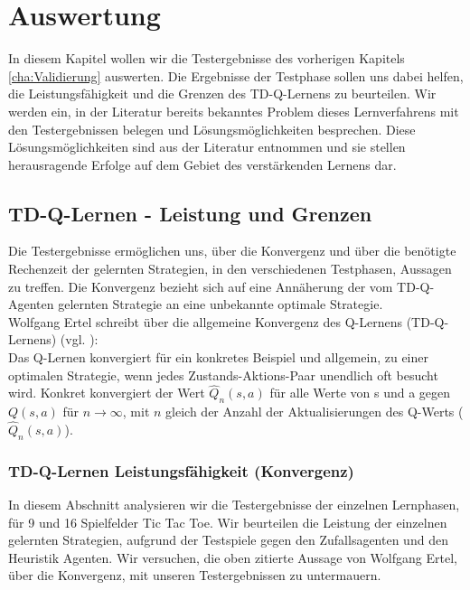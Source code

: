 \chapter{Auswertung}
\label{cha:Auswertung}
In diesem Kapitel wollen wir die Testergebnisse des vorherigen Kapitels \ref{cha:Validierung} auswerten. Die Ergebnisse der Testphase sollen uns dabei helfen, die Leistungsfähigkeit und die Grenzen des TD-Q-Lernens zu beurteilen. Wir werden ein, in der Literatur bereits bekanntes Problem dieses Lernverfahrens mit den Testergebnissen belegen und Lösungsmöglichkeiten besprechen. Diese Lösungsmöglichkeiten sind aus der Literatur entnommen und sie stellen herausragende Erfolge auf dem Gebiet des verstärkenden Lernens dar. \\

\section{TD-Q-Lernen - Leistung und Grenzen}
\label{sec:TD-Q-Lernen - Leistung und Grenzen}
Die Testergebnisse ermöglichen uns, über die Konvergenz und über die benötigte Rechenzeit der gelernten Strategien, in den verschiedenen Testphasen, Aussagen zu treffen. Die Konvergenz bezieht sich auf eine Annäherung der vom TD-Q-Agenten gelernten Strategie an eine unbekannte optimale Strategie. \\

Wolfgang Ertel schreibt über die allgemeine Konvergenz des Q-Lernens (TD-Q-Lernens) (vgl. \cite[299]{Ertel}): \\

Das Q-Lernen konvergiert für ein konkretes Beispiel und allgemein, zu einer optimalen Strategie, wenn jedes Zustands-Aktions-Paar unendlich oft besucht wird. Konkret konvergiert der Wert $\hat{Q}_n(s,a)$ für alle Werte von s und a gegen $Q(s,a)$ für $n \rightarrow \infty$, mit $n$ gleich der Anzahl der Aktualisierungen des Q-Werts ($\hat{Q}_n(s,a)$).
\newpage

\subsection{TD-Q-Lernen Leistungsfähigkeit (Konvergenz)}
In diesem Abschnitt analysieren wir die Testergebnisse der einzelnen Lernphasen, für 9 und 16 Spielfelder Tic Tac Toe. Wir beurteilen die Leistung der einzelnen gelernten Strategien, aufgrund der Testspiele gegen den Zufallsagenten und den Heuristik Agenten. Wir versuchen, die oben zitierte Aussage von Wolfgang Ertel, über die Konvergenz, mit unseren Testergebnissen zu untermauern.  \\

